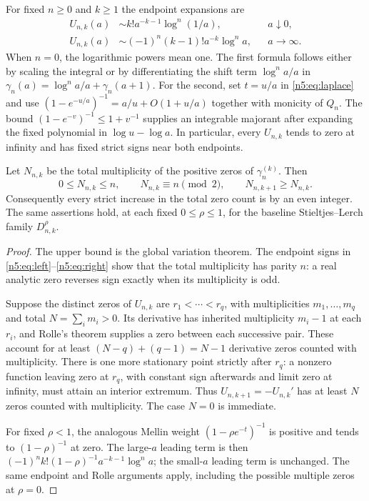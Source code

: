 For fixed $n\geq0$ and $k\geq1$ the endpoint expansions are
\begin{align}
 U_{n,k}(a)&\sim k!a^{-k-1}\log^n(1/a),&&a\downarrow0,\label{n5:eq:left}\\
 U_{n,k}(a)&\sim(-1)^n(k-1)!a^{-k}\log^n a,&&a\to\infty.
 \label{n5:eq:right}
\end{align}
When $n=0$, the logarithmic powers mean one.  The first formula follows
either by scaling the integral or by differentiating the shift term
$\log^n a/a$ in
$\gamma_n(a)=\log^n a/a+\gamma_n(a+1)$.  For the second, set $t=u/a$ in
\eqref{n5:eq:laplace} and use
$(1-e^{-u/a})^{-1}=a/u+O(1+u/a)$ together with monicity of $Q_n$.
The bound
$(1-e^{-v})^{-1}\leq1+v^{-1}$ supplies an integrable majorant after
expanding the fixed polynomial in $\log u-\log a$.
In particular, every $U_{n,k}$ tends to zero at infinity and has fixed
strict signs near both endpoints.

\begin{proposition}
\label{n5:prop:count}
Let $N_{n,k}$ be the total multiplicity of the positive zeros of
$\gamma_n^{(k)}$.  Then
\begin{equation}\label{n5:eq:count-law}
 0\leq N_{n,k}\leq n,\qquad
 N_{n,k}\equiv n\pmod2,\qquad N_{n,k+1}\geq N_{n,k}.
\end{equation}
Consequently every strict increase in the total zero count is by an even
integer.  The same assertions hold, at each fixed
$0\leq\rho\leq1$, for the baseline Stieltjes--Lerch family
$D_{n,k}^{\rho}$.
\end{proposition}
\begin{proof}
The upper bound is the global variation theorem.  The endpoint signs in
\eqref{n5:eq:left}--\eqref{n5:eq:right} show that the total multiplicity
has parity $n$: a real analytic zero reverses sign exactly when its
multiplicity is odd.

Suppose the distinct zeros of $U_{n,k}$ are
$r_1<\cdots<r_q$, with multiplicities $m_1,\ldots,m_q$ and
total $N=\sum_i m_i>0$.  Its derivative has inherited multiplicity
$m_i-1$ at each $r_i$, and Rolle's theorem supplies a zero between each
successive pair.  These account for at least
$(N-q)+(q-1)=N-1$ derivative zeros counted with multiplicity.  There is one
more stationary point strictly after $r_q$: a nonzero function leaving
zero at $r_q$, with constant sign afterwards and limit zero at infinity,
must attain an interior extremum.  Thus $U_{n,k+1}=-U_{n,k}'$ has at least
$N$ zeros counted with multiplicity.  The case $N=0$ is immediate.

For fixed $\rho<1$, the analogous Mellin weight
$(1-\rho e^{-t})^{-1}$ is positive and tends to $(1-\rho)^{-1}$ at zero.
The large-$a$ leading term is then
$(-1)^n k!(1-\rho)^{-1}a^{-k-1}\log^n a$; the small-$a$ leading term
is unchanged.  The same endpoint and Rolle arguments apply, including
the possible multiple zeros at $\rho=0$.
\end{proof}

